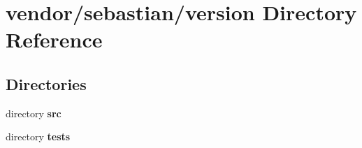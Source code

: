 \section{vendor/sebastian/version Directory Reference}
\label{dir_db9680264ea79b72cc8e91e2f3b05d76}
\subsection*{Directories}
\begin{DoxyCompactItemize}
\item 
directory {\bf src}
\item 
directory {\bf tests}
\end{DoxyCompactItemize}
